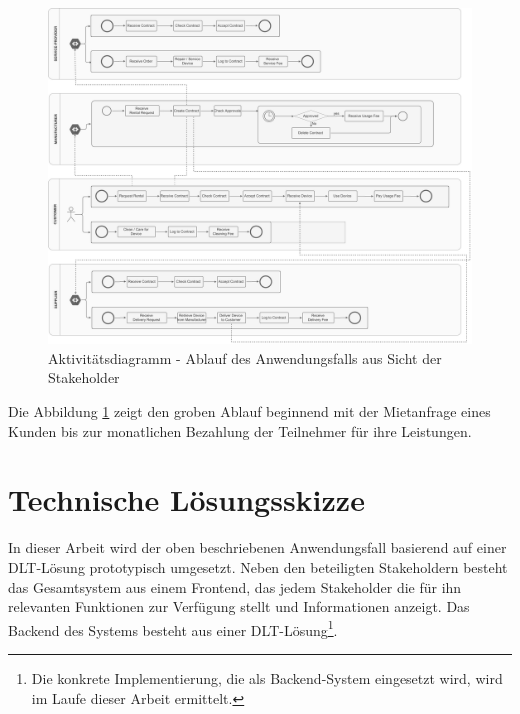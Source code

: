 \begin{figure}[h]
 \centering
 \includegraphics[width=1.0\textwidth]{gfx/UML_Act_Usecase.png}
 \caption{Aktivitätsdiagramm - Ablauf des Anwendungsfalls aus Sicht der Stakeholder}
 \label{fig:chapter04:usecase_workflow}
\end{figure}

Die Abbildung \ref{fig:chapter04:usecase_workflow} zeigt den groben Ablauf beginnend mit der Mietanfrage eines Kunden bis zur monatlichen Bezahlung der Teilnehmer für ihre Leistungen.

%
%
\section{Technische Lösungsskizze}
\label{sec:iot_usecase:solution}
In dieser Arbeit wird der oben beschriebenen Anwendungsfall basierend auf einer \ac{DLT}-Lösung prototypisch umgesetzt. Neben den beteiligten Stakeholdern besteht das Gesamtsystem aus einem Frontend, das jedem Stakeholder die für ihn relevanten Funktionen zur Verfügung stellt und Informationen anzeigt. Das Backend des Systems besteht aus einer \ac{DLT}-Lösung\footnote{Die konkrete Implementierung, die als Backend-System eingesetzt wird, wird im Laufe dieser Arbeit ermittelt.}.

